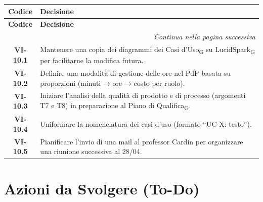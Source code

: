 \renewcommand{\arraystretch}{1.3}
\vspace{-0.3cm}
\noindent
\begin{longtable}{c p{12cm}}
	\toprule
	\textbf{Codice} & \textbf{Decisione} \\
	\midrule
	\endfirsthead

	\toprule
	\textbf{Codice} & \textbf{Decisione} \\
	\midrule
	\endhead

	\midrule
	\multicolumn{2}{r}{\textit{Continua nella pagina successiva}} \\
	\midrule
	\endfoot

	\bottomrule
	\endlastfoot

	\textbf{VI-10.1} & Mantenere una copia dei diagrammi dei Casi d'Uso\textsubscript{G} su LucidSpark\textsubscript{G} per facilitarne la modifica futura. \\[4pt]
	\textbf{VI-10.2} & Definire una modalità di gestione delle ore nel PdP basata su proporzioni (minuti → ore → costo per ruolo). \\[4pt]
	\textbf{VI-10.3} & Iniziare l’analisi della qualità di prodotto e di processo (argomenti T7 e T8) in preparazione al Piano di Qualifica\textsubscript{G}. \\[4pt]
	\textbf{VI-10.4} & Uniformare la nomenclatura dei casi d’uso (formato “UC X: testo”). \\[4pt]
	\textbf{VI-10.5} & Pianificare l’invio di una mail al professor Cardin per organizzare una riunione successiva al 28/04. \\[4pt]

	

	

\end{longtable}

\section{Azioni da Svolgere (To-Do)}

